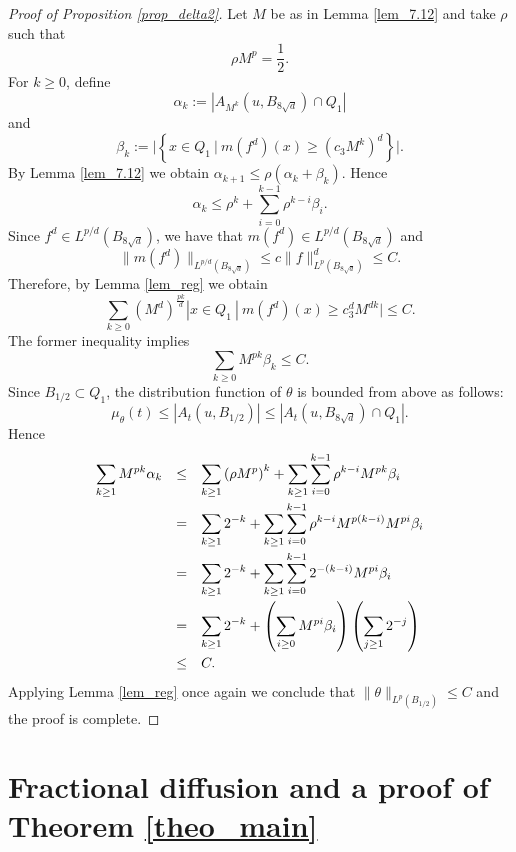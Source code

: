 \documentclass[10pt]{article} %
\begin{document}
\begin{proof}[Proof of Proposition \ref{prop_delta2}]
Let $M$ be as in Lemma \ref{lem_7.12} and take $\rho$ such that
\[
\rho M^{p} = \frac{1}{2}.
\]
For $k \geq 0$, define
\[
\alpha_k :=|A_{M^k}(u,B_{8\sqrt{d}})\cap Q_1| 
\]
and
\[
\beta_k:= \Big|\left\lbrace x\in Q_1~ | ~  m(f^d)(x)\geq \left(c_3M^{k}\right)^d\right\rbrace\Big|.
\]
By Lemma \ref{lem_7.12} we obtain $\alpha_{k+1} \leq \rho(\alpha_k + \beta_k)$. Hence
\begin{equation}\label{eq_016}
\alpha_k \leq \rho^k + \sum_{i=0}^{k-1}\rho^{k-i}\beta_i.
\end{equation}
Since $f^d \in L^{p/d}(B_{8\sqrt{d}})$, we have that $m(f^d) \in L^{p/d}(B_{8\sqrt{d}})$ and 
\[
\|m(f^d)\|_{L^{p/d}(B_{8\sqrt{d}})} \leq c\|f\|^d_{L^p(B_{8\sqrt{d}})} \leq C.
\]
Therefore, by Lemma \ref{lem_reg} we obtain
\[
\sum_{k\geq 0}\left(M^{d}\right)^\frac{pk}{d}|x\in Q_1~ | ~ m(f^d)(x)\geq c_3^dM^{dk}| \leq C.
\]
The former inequality implies
\begin{equation}\label{eq_017}
\sum_{k\geq 0}M^{pk}\beta_k \leq C.
\end{equation}
Since $B_{1/2} \subset Q_1$, the distribution function of $\theta$ is bounded from above as follows:
\[
\mu_\theta(t) \leq |A_t(u,B_{1/2})| \leq |A_t(u,B_{8\sqrt{d}})\cap Q_1|.
\]
Hence
\[
\begin{array}{rcl}
\displaystyle \sum_{k\geq 1}M^{pk}\alpha_k & \leq & \displaystyle \sum_{k\geq 1}\left(\rho M^{p}\right)^k + \sum_{k\geq 1}\sum_{i=0}^{k-1}\rho^{k-i}M^{pk}\beta_i \vspace{0.1cm} \\
 & = & \displaystyle \sum_{k\geq 1}2^{-k} + \sum_{k\geq 1}\sum_{i=0}^{k-1}\rho^{k-i}M^{p(k-i)}M^{pi}\beta_i \vspace{0.1cm} \\
 & = & \displaystyle \sum_{k\geq 1}2^{-k} + \sum_{k\geq 1}\sum_{i=0}^{k-1}2^{-(k-i)}M^{pi}\beta_i \vspace{0.1cm} \\  
 & = & \displaystyle \sum_{k\geq 1}2^{-k} + \left(\sum_{i\geq 0}M^{pi}\beta_i \right)\left(\sum_{j\geq 1}2^{-j}\right) \vspace{0.1cm} \\
 & \leq & C.
\end{array}
\]
Applying Lemma \ref{lem_reg} once again we conclude that $\|\theta\|_{L^{p}(B_{1/2})} \leq C$ and the proof is complete.
\end{proof}

\section{Fractional diffusion and a proof of Theorem \ref{theo_main} }\label{sec_proofs}
\end{document}
